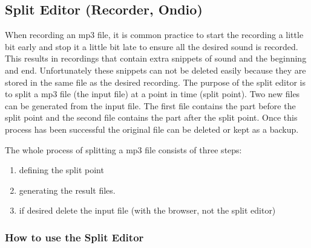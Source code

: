 \subsection{Split Editor (Recorder, Ondio)}
When recording an mp3 file, it is common practice to start the recording
a little bit early and stop it a little bit late to ensure all the
desired sound is recorded. This results in recordings that contain
extra snippets of sound and the beginning and end. Unfortunately these
snippets can not be deleted easily because they are stored in the same
file as the desired recording. The purpose of the split editor is to
split a mp3 file (the input file) at a point in time (split point). Two
new files can be generated from the input file. The first file contains
the part before the split point and the second file contains the part
after the split point. Once this process has been successful the
original file can be deleted or kept as a backup. 

The whole process of splitting a mp3 file consists of three steps: 

\begin{enumerate}
\item defining the split point 
\item generating the result files. 
\item if desired delete the input file (with the browser, not the split
editor) 
\end{enumerate}

\subsubsection{How to use the Split Editor}

